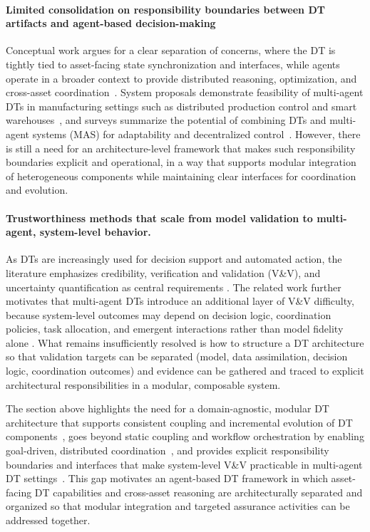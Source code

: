 \paragraph{Limited consolidation on responsibility boundaries between DT artifacts and agent-based decision-making}
Conceptual work argues for a clear separation of concerns, where the DT is tightly tied to asset-facing state synchronization and interfaces, while agents operate in a broader context to provide distributed reasoning, optimization, and cross-asset coordination~\cite{mariani2022_dt_agents_cross_fertilisation}. System proposals demonstrate feasibility of multi-agent DTs in manufacturing settings such as distributed production control and smart warehouses~\cite{nie2023_cloud_edge_dt_mas,marah2024_madtwin}, and surveys summarize the potential of combining DTs and multi-agent systems (MAS) for adaptability and decentralized control~\cite{Pretel2024SLR,Kalyani2024Survey}. However, there is still a need for an architecture-level framework that makes such responsibility boundaries explicit and operational, in a way that supports modular integration of heterogeneous components while maintaining clear interfaces for coordination and evolution.


\paragraph{Trustworthiness methods that scale from model validation to multi-agent, system-level behavior.}
As DTs are increasingly used for decision support and automated action, the literature emphasizes credibility, verification and validation (V\&V), and uncertainty quantification as central requirements \cite{shao2023credibility,sel2025_vvuq_precision_dt,kapteyn2021probabilistic}. The related work further motivates that multi-agent DTs introduce an additional layer of V\&V difficulty, because system-level outcomes may depend on decision logic, coordination policies, task allocation, and emergent interactions rather than model fidelity alone \cite{boyes2022analysis,shao2023credibility}. What remains insufficiently resolved is how to structure a DT architecture so that validation targets can be separated (model, data assimilation, decision logic, coordination outcomes) and evidence can be gathered and traced to explicit architectural responsibilities in a modular, composable system.


The section above highlights the need for a domain-agnostic, modular DT architecture that supports consistent coupling and incremental evolution of DT components~\cite{Gil2024,Kapteyn2020,Visser2024}, goes beyond static coupling and workflow orchestration by enabling goal-driven, distributed coordination~\cite{Pretel2024SLR,mariani2022_dt_agents_cross_fertilisation}, and provides explicit responsibility boundaries and interfaces that make system-level V\&V practicable in multi-agent DT settings~\cite{shao2023credibility,sel2025_vvuq_precision_dt,boyes2022analysis}. This gap motivates an agent-based DT framework in which asset-facing DT capabilities and cross-asset reasoning are architecturally separated and organized so that modular integration and targeted assurance activities can be addressed together.

